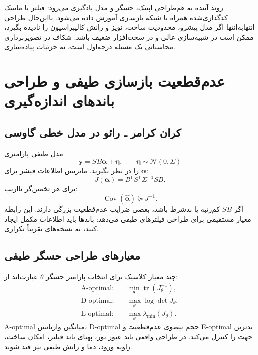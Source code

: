 \documentclass[12pt,openany,oneside]{book}
\newcommand{\Cov}{\operatorname{Cov}}
\newcommand{\trans}{^{\mathsf T}}
\newcommand{\vect}[1]{\bm{#1}}
\begin{document}
\begin{futurebox}
روند آینده به هم‌طراحی اپتیک، حسگر و مدل یادگیری می‌رود: فیلتر یا ماسک کدگذاری‌شده همراه با شبکه
بازسازی آموزش داده می‌شود. بااین‌حال طراحی انتهابه‌انتها اگر مدل پیشرو، محدودیت ساخت، نویز و رانش
کالیبراسیون را نادیده بگیرد، ممکن است در شبیه‌سازی عالی و در سخت‌افزار ضعیف باشد. شکاف
 در تصویربرداری محاسباتی یک مسئله درجه‌اول است، نه جزئیات پیاده‌سازی.
\end{futurebox}


\section{عدم‌قطعیت بازسازی طیفی و طراحی باندهای اندازه‌گیری}

\subsection{کران کرامر ـ رائو در مدل خطی گاوسی}

مدل طیفی پارامتری
\begin{equation}
\vect y=S B\vect\alpha+\vect\eta,
\qquad \vect\eta\sim\mathcal N(0,\Sigma)
\end{equation}
را در نظر بگیرید. ماتریس اطلاعات فیشر برای \(\vect\alpha\):
\begin{equation}
J(\vect\alpha)=B\trans S\trans\Sigma^{-1}SB.
\end{equation}
برای هر تخمین‌گر نااریب:
\begin{equation}
\Cov(\widehat{\vect\alpha})\succeq J^{-1}.
\label{eq:spectral-crlb}
\end{equation}
اگر \(SB\) کم‌رتبه یا بدشرط باشد، بعضی ضرایب عدم‌قطعیت بزرگی دارند. این رابطه معیار مستقیمی برای
طراحی فیلترهای طیفی می‌دهد: باندها باید اطلاعات مکمل ایجاد کنند، نه نسخه‌های تقریباً تکراری.

\subsection{معیارهای طراحی حسگر طیفی}

چند معیار کلاسیک برای انتخاب پارامتر حسگر \(\theta\) عبارت‌اند از:
\begin{align}
\text{A-optimal:}&\quad \min_\theta\operatorname{tr}(J_\theta^{-1}),\\
\text{D-optimal:}&\quad \max_\theta\log\det J_\theta,\\
\text{E-optimal:}&\quad \max_\theta\lambda_{\min}(J_\theta).
\end{align}
A-optimal میانگین واریانس، D-optimal حجم بیضوی عدم‌قطعیت و E-optimal بدترین جهت را کنترل می‌کند.
در طراحی واقعی باید عبور نور، پهنای باند فیلتر، امکان ساخت، زاویه ورود، دما و رانش طیفی نیز قید شوند.
\end{document}
